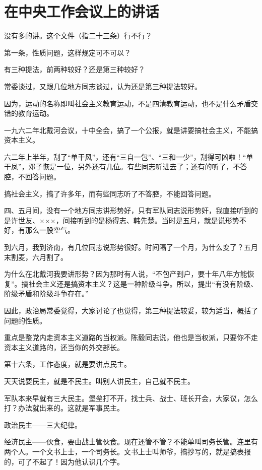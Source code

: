 \section[在中央工作会议上的讲话（一九六四年十二月二十八日）]{在中央工作会议上的讲话}


没有多的讲。这个文件（指二十三条）行不行？

第一条，性质问题，这样规定可不可以？

有三种提法，前两种较好？还是第三种较好？

常委谈过，又跟几位地方同志谈过，认为还是第三种提法较好。

因为，运动的名称即叫社会主义教育运动，不是四清教育运动，也不是什么矛盾交错的教育运动。

一九六二年北戴河会议，十中全会，搞了一个公报，就是讲要搞社会主义，不能搞资本主义。

六二年上半年，刮了“单干风”，还有“三自一包”、“三和一少”，刮得可凶啦！“单干凤”，邓子恢是一位，另外还有几位。有些同志听进去了；还有的听了，不答腔，不回答问题。

搞社会主义，搞了许多年，而有些同志听了不答腔，不能回答问题。

四、五月间，没有一个地方同志讲形势好，只有军队同志说形势奸，我直接听到的是许世友、×××，间接听到的是杨得志、韩先楚。当时是五月，就是说形势不好，有那么一股空气。

到六月，我到济南，有几位同志说形势很好。时间隔了一个月，为什么变了？五月末割麦，六月割了。

为什么在北戴河我要讲形势？因为那时有人说，“不包产到户，要十年八年方能恢复”。搞社会主义还是搞资本主义？这是一种阶级斗争。所以，提出“有没有阶级、阶级矛盾和阶级斗争存在。”

因此，政治局常委觉得，大家讨论了也觉得，第三种提法较妥，较为适当，概括了问题的性质。

重点是整党内走资本主义道路的当权派。陈毅同志说，他也是当权派，只要你不走资本主义道路的，还当你的外交部长。

第十六条，工作态度，就是要讲点民主。

天天说要民主，就是不民主。叫别人讲民主，自己就不民主。

军队本来早就有三大民主。堡垒打不开，找士兵、战士、班长开会，大家议，怎么打？办法就出来的。这就是军事民主。

政治民主——三大纪律。

经济民主——伙食，要由战士管伙食。现在还管不管？不能单叫司务长管。连里有两个人。一个文书上士，一个司务长。文书上士叫师爷，搞抄写的，就是搞表报的，可了不起了！因为他认识几个字。

